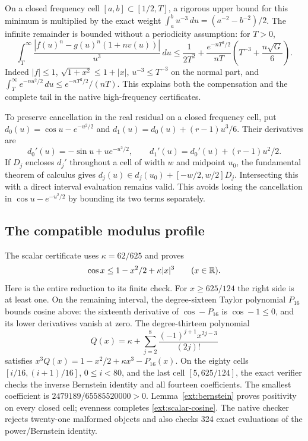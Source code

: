 On a closed frequency cell $[a,b]\subset[1/2,T]$, a rigorous upper
bound for this minimum is multiplied by the exact weight
$\int_a^b u^{-3}\,du=(a^{-2}-b^{-2})/2$. The infinite remainder is
bounded without a periodicity assumption: for $T>0$,
\[
 \int_T^\infty\frac{|f(u)^n-g(u)^n(1+nv(u))|}{u^3}\,du
 \le\frac1{2T^2}
 +\frac{e^{-nT^2/2}}{nT}
 \left(T^{-3}+\frac{n\sqrt G}{6}\right).
\]
Indeed $|f|\le1$, $\sqrt{1+x^2}\le1+|x|$, $u^{-3}\le T^{-3}$
on the normal part, and
$\int_T^\infty e^{-nu^2/2}\,du\le e^{-nT^2/2}/(nT)$.
This explains both the compensation and the complete tail in the native
high-frequency certificates.

To preserve cancellation in the real residual on a closed frequency cell,
put $d_0(u)=\cos u-e^{-u^2/2}$ and
$d_1(u)=d_0(u)+(r-1)u^3/6$. Their derivatives are
\[
 d_0'(u)=-\sin u+ue^{-u^2/2},\qquad
 d_1'(u)=d_0'(u)+(r-1)u^2/2.
\]
If $D_j$ encloses $d_j'$ throughout a cell of width $w$ and midpoint
$u_0$, the fundamental theorem of calculus gives
$d_j(u)\in d_j(u_0)+[-w/2,w/2]D_j$.
Intersecting this with a direct interval evaluation remains valid.
This avoids losing the cancellation in $\cos u-e^{-u^2/2}$ by bounding
its two terms separately.

\subsection{The compatible modulus profile}
\label{ext:cosine-profile}
The scalar certificate uses $\kappa=62/625$ and proves
\begin{equation}\label{ext:scalar-cosine}
 \cos x\le1-x^2/2+\kappa|x|^3\qquad(x\in\mathbb R).
\end{equation}
Here is the entire reduction to its finite check. For $x\ge625/124$ the
right side is at least one. On the remaining interval, the degree-sixteen
Taylor polynomial $P_{16}$ bounds cosine above: the sixteenth derivative
of $\cos-P_{16}$ is $\cos-1\le0$, and its lower derivatives vanish at
zero. The degree-thirteen polynomial
\[
 Q(x)=\kappa+\sum_{j=2}^{8}\frac{(-1)^{j+1}x^{2j-3}}{(2j)!}
\]
satisfies $x^3Q(x)=1-x^2/2+\kappa x^3-P_{16}(x)$.
On the eighty cells $[i/16,(i+1)/16]$, $0\le i<80$, and the last
cell $[5,625/124]$, the exact verifier checks the inverse Bernstein
identity and all fourteen coefficients. The smallest coefficient is
$2479189/65585520000>0$. Lemma~\ref{ext:bernstein} proves positivity
on every closed cell; evenness completes \eqref{ext:scalar-cosine}.
The native checker rejects twenty-one malformed objects and also checks
324 exact evaluations of the power/Bernstein identity.

